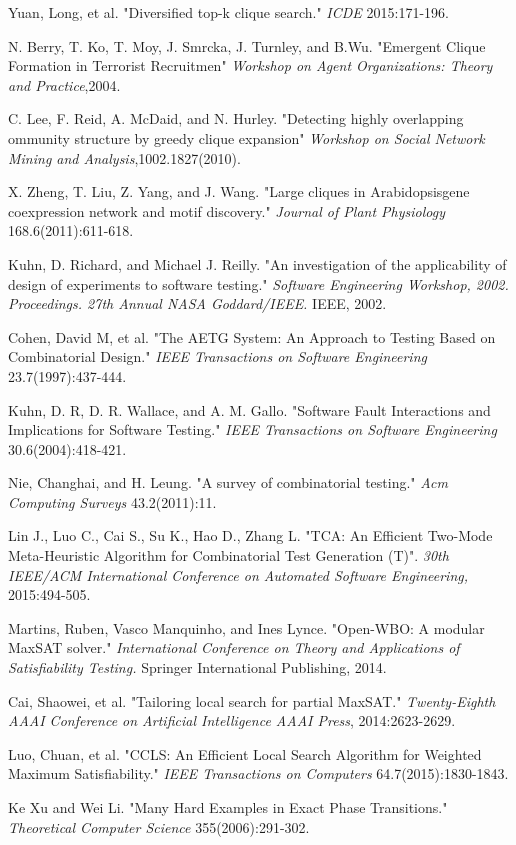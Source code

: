 \documentclass{llncs}
\begin{document}
\begin{thebibliography}{}
Yuan, Long, et al.
"Diversified top-k clique search."
{\it ICDE} 2015:171-196.

N. Berry, T. Ko, T. Moy, J. Smrcka, J. Turnley, and B.Wu.
"Emergent Clique Formation in Terrorist Recruitmen"
{\it Workshop on Agent Organizations: Theory and Practice},2004.


C. Lee, F. Reid, A. McDaid, and N. Hurley. "Detecting highly overlapping ommunity structure by greedy clique expansion"
{\it Workshop on Social Network Mining and Analysis},1002.1827(2010).


X. Zheng, T. Liu, Z. Yang, and J. Wang.
"Large cliques in Arabidopsisgene coexpression network and motif discovery."
{\it Journal of Plant Physiology} 168.6(2011):611-618.

Kuhn, D. Richard, and Michael J. Reilly.
"An investigation of the applicability of design of experiments to software testing."
{\it Software Engineering Workshop, 2002. Proceedings. 27th Annual NASA Goddard/IEEE.} IEEE, 2002.

Cohen, David M, et al.
"The AETG System: An Approach to Testing Based on Combinatorial Design."
{\it IEEE Transactions on Software Engineering} 23.7(1997):437-444.

Kuhn, D. R, D. R. Wallace, and A. M. Gallo.
"Software Fault Interactions and Implications for Software Testing."
{\it IEEE Transactions on Software Engineering} 30.6(2004):418-421.

Nie, Changhai, and H. Leung.
"A survey of combinatorial testing."
{\it Acm Computing Surveys} 43.2(2011):11.

Lin J., Luo C., Cai S., Su K., Hao D., Zhang L.
"TCA: An Efficient Two-Mode Meta-Heuristic Algorithm for Combinatorial Test Generation (T)". {\it 30th IEEE/ACM International Conference on Automated Software Engineering,} 2015:494-505.

Martins, Ruben, Vasco Manquinho, and Ines Lynce. "Open-WBO: A modular MaxSAT solver."
{\it International Conference on Theory and Applications of Satisfiability Testing.}
Springer International Publishing, 2014.

Cai, Shaowei, et al.
"Tailoring local search for partial MaxSAT."
{\it Twenty-Eighth AAAI Conference on Artificial Intelligence AAAI Press}, 2014:2623-2629.

Luo, Chuan, et al.
"CCLS: An Efficient Local Search Algorithm for Weighted Maximum Satisfiability."
{\it IEEE Transactions on Computers} 64.7(2015):1830-1843.

Ke Xu and Wei Li.
"Many Hard Examples in Exact Phase Transitions."
{\it Theoretical Computer Science} 355(2006):291-302.




\end{thebibliography}

%
\end{document}
